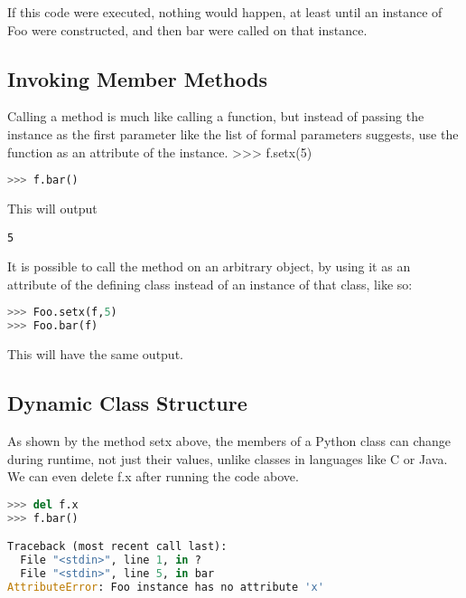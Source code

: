 If this code were executed, nothing would happen, at least until an instance of
Foo were constructed, and then bar were called on that instance.

\subsection{Invoking Member Methods}
Calling a method is much like calling a function, but instead of passing the
instance as the first parameter like the list of formal parameters suggests, use
the function as an attribute of the instance.
>>> f.setx(5)
\lstset{basicstyle=\scriptsize, numbers=left, captionpos=b, tabsize=4}
\begin{lstlisting}[caption=Calling Member Functions,language={Python},
xleftmargin=15pt, label=lst:callingmemberfunctions]
>>> f.bar()
\end{lstlisting}

This will output
\scriptsize
\begin{verbatim}
5
\end{verbatim}
\normalsize

It is possible to call the method on an arbitrary object, by using it as an
attribute of the defining class instead of an instance of that class, like so:
\lstset{basicstyle=\scriptsize, numbers=left, captionpos=b, tabsize=4}
\begin{lstlisting}[caption=Call on arbitrary object,language={Python},
xleftmargin=15pt, label=lst:callonarbitraryobject]
>>> Foo.setx(f,5)
>>> Foo.bar(f)
\end{lstlisting}

This will have the same output.

\subsection{Dynamic Class Structure}
As shown by the method setx above, the members of a Python class can change
during runtime, not just their values, unlike classes in languages like C or
Java. We can even delete f.x after running the code above.
\lstset{basicstyle=\scriptsize, numbers=left, captionpos=b, tabsize=4}
\begin{lstlisting}[caption=Delete class Member,language={Python},
xleftmargin=15pt, label=lst:deleteclassmember]
>>> del f.x
>>> f.bar()

Traceback (most recent call last):
  File "<stdin>", line 1, in ?
  File "<stdin>", line 5, in bar
AttributeError: Foo instance has no attribute 'x'
\end{lstlisting}

